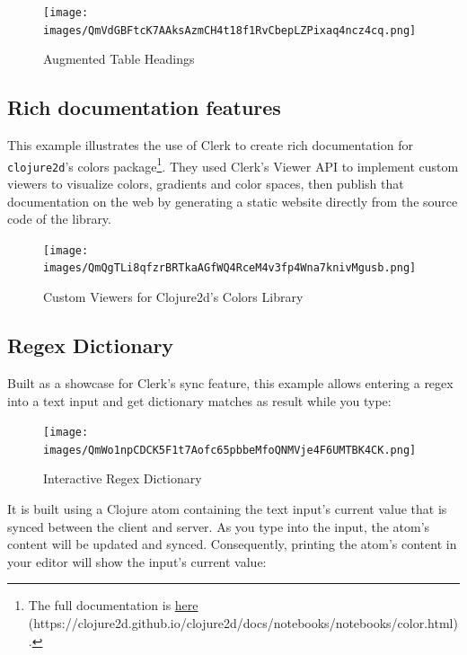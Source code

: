 \documentclass[sigconf,screen]{acmart}
\newcommand{\passthrough}[1]{#1}
\begin{document}
\begin{figure}
\hypertarget{augmented-table-headings}{%
\centering
\texttt{[image: images/QmVdGBFtcK7AAksAzmCH4t18f1RvCbepLZPixaq4ncz4cq.png]}
\caption{Augmented Table Headings}\label{augmented-table-headings}
}
\end{figure}

\hypertarget{rich-documentation-features}{%
\subsection{Rich documentation features}\label{rich-documentation-features}}

This example illustrates the use of Clerk to create rich documentation for \passthrough{\lstinline!clojure2d!}'s colors package\footnote{The full documentation is {\href{https://clojure2d.github.io/clojure2d/docs/notebooks/notebooks/color.html}{here} (https://clojure2d.github.io/clojure2d/docs/notebooks/notebooks/color.html)}.}. They used Clerk's Viewer API to implement custom viewers to visualize colors, gradients and color spaces, then publish that documentation on the web by generating a static website directly from the source code of the library.

\begin{figure}
\hypertarget{custom-viewers-for-clojure2ds-colors-library}{%
\centering
\texttt{[image: images/QmQgTLi8qfzrBRTkaAGfWQ4RceM4v3fp4Wna7knivMgusb.png]}
\caption{Custom Viewers for Clojure2d's Colors Library}\label{custom-viewers-for-clojure2ds-colors-library}
}
\end{figure}

\hypertarget{regex-dictionary}{%
\subsection{Regex Dictionary}\label{regex-dictionary}}

Built as a showcase for Clerk's sync feature, this example allows entering a regex into a text input and get dictionary matches as result while you type:

\begin{figure}
\hypertarget{interactive-regex-dictionary}{%
\centering
\texttt{[image: images/QmWo1npCDCK5F1t7Aofc65pbbeMfoQNMVje4F6UMTBK4CK.png]}
\caption{Interactive Regex Dictionary}\label{interactive-regex-dictionary}
}
\end{figure}

It is built using a Clojure atom containing the text input's current value that is synced between the client and server. As you type into the input, the atom's content will be updated and synced. Consequently, printing the atom's content in your editor will show the input's current value:
\end{document}
